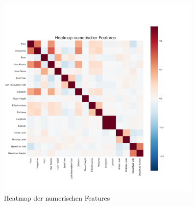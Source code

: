 \begin{figure}[h!]
\centering
\includegraphics[width=0.9\textwidth]{images/Heatmap_numerical.png}
\caption[Heatmap der numerischen Features]{Heatmap der numerischen Features}
\label{fig:heatmap}
\end{figure}

\newpage
